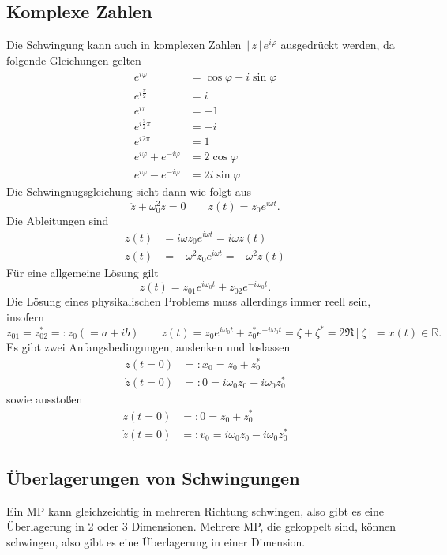 \documentclass[a4paper,12pt]{article}
\begin{document}
\subsection{Komplexe Zahlen}
Die Schwingung kann auch in komplexen Zahlen $\,|\, z\,|\, e^{i\varphi }$ ausgedrückt werden, da folgende Gleichungen gelten
\begin{align*}
        e^{i\varphi }&=\cos \varphi +i\sin \varphi \\
        e^{i\tfrac{\pi }{2}}&=i\\
        e^{i\pi }&=-1\\
        e^{i\tfrac{3}{2}\pi }&=-i\\
        e^{i2\pi }&=1\\
        e^{i\varphi }+e^{-i\varphi }&=2\cos \varphi \\
        e^{i\varphi }-e^{-i\varphi }&=2i\sin \varphi 
\end{align*}
Die Schwingnugsgleichung sieht dann wie folgt aus
\[ 
        \ddot{z}+\omega _0^2z=0\qquad z\left(t\right)=z_0e^{i\omega t}
.\] 
Die Ableitungen sind
\begin{align*} %
        \dot{z}\left(t\right)&=i\omega z_0e^{i\omega t}=i\omega z\left(t\right)\\
        \ddot{z}\left(t\right)&=-\omega ^2z_0e^{i\omega t}=-\omega ^2z\left(t\right)
\end{align*}
Für eine allgemeine Lösung gilt
\[ 
        z\left(t\right)=z_{01}e^{i\omega _0t}+z_{02}e^{-i\omega _0t}
.\] 
Die Lösung eines physikalischen Problems muss allerdings immer reell sein, insofern
\[ 
        z_{01}=z_{02}^*=:z_0\left(=a+ib\right)\qquad z\left(t\right)=z_0e^{i\omega _0t}+z_0^*e^{-i\omega _0t}=\zeta +\zeta ^*=2 \mathfrak{R}[\zeta ]=x\left(t\right) \in \mathbb{R}
.\] 
Es gibt zwei Anfangsbedingungen, auslenken und loslassen
\begin{align*} %
        z\left(t=0\right)&=:x_0=z_0+z_0^*\\
        \dot{z}\left(t=0\right)&=:0=i\omega _0z_0-i\omega _0z_0^*
\end{align*}
sowie ausstoßen
\begin{align*}
        z\left(t=0\right)&=:0=z_0+z_0^*\\
        \dot{z}\left(t=0\right)&=:v_0=i\omega _0z_0-i\omega _0z_0^*
\end{align*}

\subsection{Überlagerungen von Schwingungen}
Ein MP kann gleichzeichtig in mehreren Richtung schwingen, also gibt es eine Überlagerung in 2 oder 3 Dimensionen. Mehrere MP, die gekoppelt sind, können schwingen, also gibt es eine Überlagerung in einer Dimension.
\end{document}
